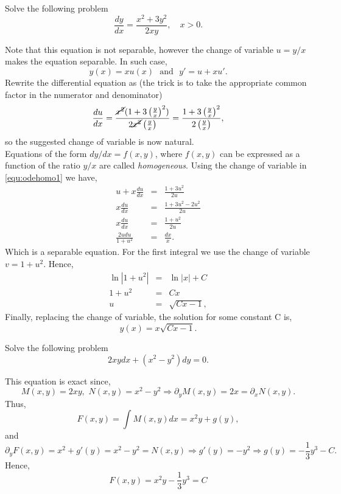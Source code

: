 \documentclass[11pt]{article}
\begin{document}
\begin{problem}
Solve the following problem
\begin{equation*}
\frac{dy}{dx}=\frac{x^{2}+3y^{2}}{2xy}, \quad x>0. 
\end{equation*}
\end{problem}
\begin{solution}
Note that this equation is not separable, however the change of variable $u=y/x$ makes the equation separable. In such case,
$$y(x)=x u(x) \,\,\text{ and }\,\, y'=u + x u'.$$ Rewrite the differential equation as (the trick is to take the appropriate common factor in the numerator and denominator)
\begin{equation}\label{equ:odehomo1}
     \frac{du}{dx}=\frac{\cancel{x^{2}}(1+3\left(\frac{y}{x}\right)^{2})}{2\cancel{x^{2}}\left(\frac{y}{x}\right)}=\frac{1+3\left(\frac{y}{x}\right)^{2}}{2\left(\frac{y}{x}\right)},
\end{equation}
so the suggested change of variable is now natural. \\
Equations of the form $dy/dx = f(x,y)$, where $f(x,y)$ can be expressed as a function of the ratio $y/x$ are called \textit{homogeneous}. Using the change of variable in \eqref{equ:odehomo1} we have,
\begin{eqnarray*}
u +x \frac{du}{dx}& = & \frac{1+3u^{2}}{2u}\\
x\frac{du}{dx} & = & \frac{1+3u^2 -2u^2}{2u}\\
x\frac{du}{dx}& = & \frac{1+u^{2}}{2u}\\
\frac{2udu}{1+u^{2}}& = &\frac{dx}{x}. 
\end{eqnarray*}
Which is a separable equation. For the first integral we use the change of variable $v=1+u^{2}$. Hence,
\begin{eqnarray*}
\ln |1+u^{2}|& = & \ln |x| + C\\
1+u^2& = & C x\\
u & = &\sqrt{C x - 1},
\end{eqnarray*}
Finally, replacing the change of variable, the solution for some constant C is,
\begin{equation*}
\boxed{y(x)=x\sqrt{C x - 1}}.
\end{equation*}

\end{solution}


\begin{problem}
Solve the following problem
\begin{equation*}
2xy dx+(x^{2}-y^{2})dy=0. 
\end{equation*}
\end{problem}
\begin{solution}
This equation is exact since,
\[M(x,y)=2xy,\,\, N(x,y)= x^{2}-y^{2} \Rightarrow \partial_{y}M(x,y)= 2x = \partial_{x}N(x,y). \]
Thus, 
\[F(x,y)= \int M(x,y) dx = x^{2}y + g(y),\]
and
\[\partial_{y}F(x,y)=x^{2}+g'(y) = x^{2}-y^{2} = N(x,y) \Rightarrow g'(y) = -y^{2} \Rightarrow g(y)= -\frac{1}{3}y^{3}-C.\]
Hence,
\[\boxed{F(x,y)=x^{2}y-\frac{1}{3}y^{3}=C}\]
\end{solution}
\end{document}
